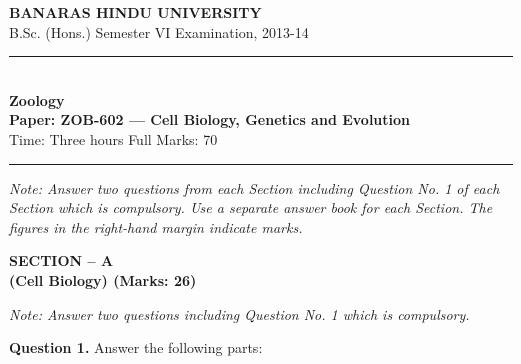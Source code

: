 \documentclass[11pt,a4paper]{article}
\begin{document}
\begin{center}
  {\large\bfseries BANARAS HINDU UNIVERSITY}\\[2pt]
  {\normalsize B.Sc. (Hons.) Semester VI Examination, 2013-14}\\[6pt]
  \rule{0.8\linewidth}{0.5pt}\\[6pt]
  {\large\bfseries Zoology}\\[4pt]
  {\large\bfseries Paper: ZOB-602 --- Cell Biology, Genetics and Evolution}\\[4pt]
  {\normalsize Time: Three hours \hfill Full Marks: 70}
\end{center}

\rule{\linewidth}{0.4pt}

\smallskip



\noindent   \textit{Note: Answer two questions from each Section including Question No. 1 of each Section which is compulsory. Use a separate answer book for each Section. The figures in the right-hand margin indicate marks.}

\bigskip

\begin{center}
   \textbf{SECTION -- A} \\
   \textbf{(Cell Biology) (Marks: 26)}
\end{center}

\smallskip



\noindent   \textit{Note: Answer two questions including Question No. 1 which is compulsory.}

\medskip


\noindent   \textbf{Question 1.} Answer the following parts:
\end{document}
